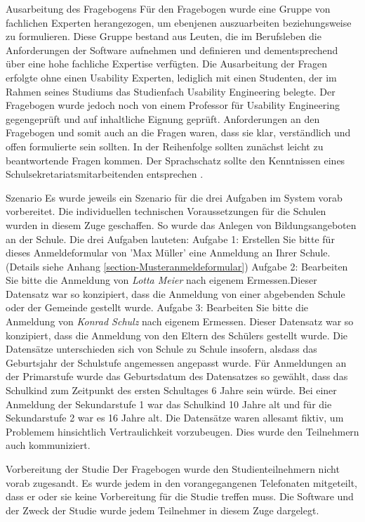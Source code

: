 Ausarbeitung des Fragebogens
Für den Fragebogen wurde eine Gruppe von fachlichen Experten herangezogen, um ebenjenen auszuarbeiten beziehungsweise zu formulieren. Diese Gruppe bestand aus Leuten, die im Berufsleben die Anforderungen der Software aufnehmen und definieren und dementsprechend über eine hohe fachliche Expertise verfügten. Die Ausarbeitung der Fragen erfolgte ohne einen Usability Experten, lediglich mit einen Studenten, der im Rahmen seines Studiums das Studienfach \glqq Usability Engineering\grqq{} belegte. Der Fragebogen wurde jedoch noch von einem Professor für Usability Engineering gegengeprüft und auf inhaltliche Eignung geprüft. 
Anforderungen an den Fragebogen und somit auch an die Fragen waren, dass sie klar, verständlich und offen formulierte sein sollten. In der Reihenfolge sollten zunächst leicht zu beantwortende Fragen kommen. Der Sprachschatz sollte den Kenntnissen eines Schulsekretariatsmitarbeitenden entsprechen \cite{Kruse_2015}. 

Szenario
Es wurde jeweils ein Szenario für die drei Aufgaben im System vorab vorbereitet. Die individuellen technischen Voraussetzungen für die Schulen wurden in diesem Zuge geschaffen. So wurde das Anlegen von Bildungsangeboten an der Schule. Die drei Aufgaben lauteten:
Aufgabe 1: \glqq Erstellen Sie bitte für dieses Anmeldeformular von 'Max Müller' eine Anmeldung an Ihrer Schule.\glqq  (Details siehe Anhang \ref{section-Musteranmeldeformular})
Aufgabe 2: \glqq Bearbeiten Sie bitte die Anmeldung von \textit{Lotta Meier} nach eigenem Ermessen.\glqq  Dieser Datensatz war so konzipiert, dass die Anmeldung von einer abgebenden Schule oder der Gemeinde gestellt wurde.
Aufgabe 3: \glqq Bearbeiten Sie bitte die Anmeldung von \textit{Konrad Schulz} nach eigenem Ermessen\grqq{}. Dieser Datensatz war so konzipiert, dass die Anmeldung von den Eltern des Schülers gestellt wurde.
Die Datensätze unterschieden sich von Schule zu Schule insofern, alsdass das Geburtsjahr der Schulstufe angemessen angepasst wurde. Für Anmeldungen an der Primarstufe wurde das Geburtsdatum des Datensatzes so gewählt, dass das Schulkind zum Zeitpunkt des ersten Schultages 6 Jahre sein würde. Bei einer Anmeldung der Sekundarstufe 1 war das Schulkind 10 Jahre alt und für die Sekundarstufe 2 war es 16 Jahre alt. Die Datensätze waren allesamt fiktiv, um Problemem hinsichtlich Vertraulichkeit vorzubeugen. Dies wurde den Teilnehmern auch kommuniziert.

Vorbereitung der Studie 
Der Fragebogen wurde den Studienteilnehmern nicht vorab zugesandt. Es wurde jedem in den vorangegangenen Telefonaten mitgeteilt, dass er oder sie keine Vorbereitung für die Studie treffen muss. Die Software und der Zweck der Studie wurde jedem Teilnehmer in diesem Zuge dargelegt.

